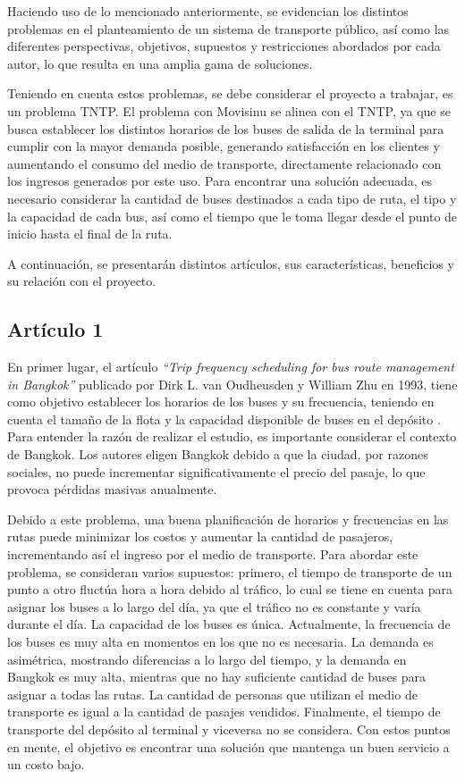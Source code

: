 \documentclass[preprint,11pt]{elsarticle}
\begin{document}
Haciendo uso de lo mencionado anteriormente, se evidencian los distintos problemas en el planteamiento de un sistema de transporte público, así como las diferentes perspectivas, objetivos, supuestos y restricciones abordados por cada autor, lo que resulta en una amplia gama de soluciones.

Teniendo en cuenta estos problemas, se debe considerar el proyecto a trabajar, es un problema TNTP. El problema con Movisinu se alinea con el TNTP, ya que se busca establecer los distintos horarios de los buses de salida de la terminal para cumplir con la mayor demanda posible, generando satisfacción en los clientes y aumentando el consumo del medio de transporte, directamente relacionado con los ingresos generados por este uso. Para encontrar una solución adecuada, es necesario considerar la cantidad de buses destinados a cada tipo de ruta, el tipo y la capacidad de cada bus, así como el tiempo que le toma llegar desde el punto de inicio hasta el final de la ruta.

A continuación, se presentarán distintos artículos, sus características, beneficios y su relación con el proyecto.


\subsection*{Artículo 1}

En primer lugar, el artículo \textit{“Trip frequency scheduling for bus route management in Bangkok”} publicado por Dirk L. van Oudheusden y William Zhu en 1993, tiene como objetivo establecer los horarios de los buses y su frecuencia, teniendo en cuenta el tamaño de la flota y la capacidad disponible de buses en el depósito \cite{vanoudheusden1995}. Para entender la razón de realizar el estudio, es importante considerar el contexto de Bangkok. Los autores eligen Bangkok debido a que la ciudad, por razones sociales, no puede incrementar significativamente el precio del pasaje, lo que provoca pérdidas masivas anualmente.

Debido a este problema, una buena planificación de horarios y frecuencias en las rutas puede minimizar los costos y aumentar la cantidad de pasajeros, incrementando así el ingreso por el medio de transporte. Para abordar este problema, se consideran varios supuestos: primero, el tiempo de transporte de un punto a otro fluctúa hora a hora debido al tráfico, lo cual se tiene en cuenta para asignar los buses a lo largo del día, ya que el tráfico no es constante y varía durante el día. La capacidad de los buses es única. Actualmente, la frecuencia de los buses es muy alta en momentos en los que no es necesaria. La demanda es asimétrica, mostrando diferencias a lo largo del tiempo, y la demanda en Bangkok es muy alta, mientras que no hay suficiente cantidad de buses para asignar a todas las rutas. La cantidad de personas que utilizan el medio de transporte es igual a la cantidad de pasajes vendidos. Finalmente, el tiempo de transporte del depósito al terminal y viceversa no se considera. Con estos puntos en mente, el objetivo es encontrar una solución que mantenga un buen servicio a un costo bajo.
\end{document}
